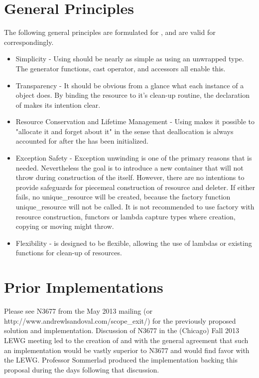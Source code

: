 \documentclass[ebook,11pt,article]{memoir}
\begin{document}
\section{General Principles}
The following general principles are formulated for , and are valid for  correspondingly.
\begin{itemize}
\item Simplicity - Using  should be nearly as simple as using an unwrapped type.  The generator functions, cast operator, and accessors all enable this.
\item Transparency - It should be obvious from a glance what each instance of a  object does.  By binding the resource to it's clean-up routine, the declaration of  makes its intention clear.
\item Resource Conservation and Lifetime Management - Using  makes it possible to "allocate it and forget about it" in the sense that deallocation is always accounted for after the  has been initialized.
\item Exception Safety - Exception unwinding is one of the primary reasons that  is needed.  Nevertheless the goal is to introduce a new container that will not throw during construction of the  itself. However, there are no intentions to provide safeguards for piecemeal construction of resource and deleter. If either fails, no unique_resource will be created, because the factory function unique_resource will not be called. It is not recommended to use  factory with resource construction, functors or lambda capture types where creation, copying or moving might throw.
\item Flexibility -  is designed to be flexible, allowing the use of lambdas or existing functions for clean-up of resources. 
\end{itemize}

\section{Prior Implementations}
Please see N3677 from the May 2013 mailing (or http://www.andrewlsandoval.com/scope_exit/) for the previously proposed solution and implementation.  Discussion of N3677 in the (Chicago) Fall 2013 LEWG meeting led to the creation of  and  with the general agreement that such an implementation would be vastly superior to N3677 and would find favor with the LEWG.  Professor Sommerlad produced the implementation backing this proposal during the days following that discussion.
\end{document}

